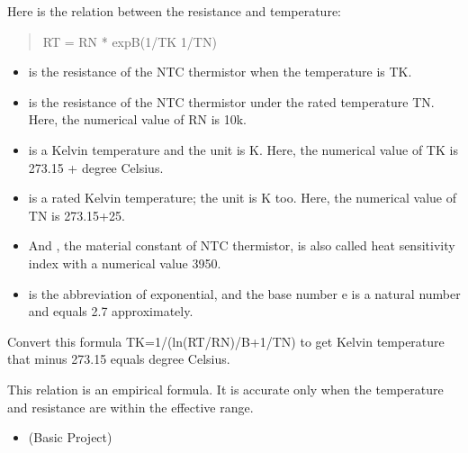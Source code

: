 \documentclass[a4paper,11pt,english]{sphinxmanual}
\begin{document}
\sphinxAtStartPar
Here is the relation between the resistance and temperature:
\begin{quote}

\sphinxAtStartPar
RT = RN * expB(1/TK \textendash{} 1/TN)
\end{quote}
\begin{itemize}
\item {} 
\sphinxAtStartPar
{} is the resistance of the NTC thermistor when the temperature is TK.

\item {} 
\sphinxAtStartPar
{} is the resistance of the NTC thermistor under the rated temperature TN. Here, the numerical value of RN is 10k.

\item {} 
\sphinxAtStartPar
{} is a Kelvin temperature and the unit is K. Here, the numerical value of TK is 273.15 + degree Celsius.

\item {} 
\sphinxAtStartPar
{} is a rated Kelvin temperature; the unit is K too. Here, the numerical value of TN is 273.15+25.

\item {} 
\sphinxAtStartPar
And , the material constant of NTC thermistor, is also called heat sensitivity index with a numerical value 3950.

\item {} 
\sphinxAtStartPar
{} is the abbreviation of exponential, and the base number e is a natural number and equals 2.7 approximately.

\end{itemize}

\sphinxAtStartPar
Convert this formula TK=1/(ln(RT/RN)/B+1/TN) to get Kelvin temperature that minus 273.15 equals degree Celsius.

\sphinxAtStartPar
This relation is an empirical formula. It is accurate only when the temperature and resistance are within the effective range.

\sphinxAtStartPar
{}
\begin{itemize}
\item {} 
\sphinxAtStartPar
{\hyperref[\detokenize{Basic_Project/Thermistor:basic-thermistor}]{}} (Basic Project)

\end{itemize}
\end{document}
